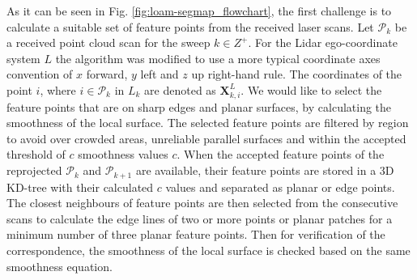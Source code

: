 \documentclass[letterpaper, 10 pt, conference]{ieeeconf}  %
\begin{document}
As it can be seen in Fig. \ref{fig:loam-segmap_flowchart}, the first challenge is to calculate a suitable set of feature points from the received laser scans. Let $\mathcal{P}_k$ be a received point cloud scan for the sweep $k \in Z^+$. For the Lidar ego-coordinate system ${L}$ the algorithm was modified to use a more typical coordinate axes convention of $x$ forward, $y$ left and $z$ up right-hand rule. The coordinates of the point $i$, where $i \in \mathcal{P}_k$ in ${L_k}$ are denoted as $\boldsymbol{X}_{k,i}^L$. 
We would like to select the feature points that are on sharp edges and planar surfaces, by calculating the smoothness of the local surface. The selected feature points are filtered by region to avoid over crowded areas, unreliable parallel surfaces and  within the accepted threshold of $c$ smoothness values $c$.
When the accepted feature points of the reprojected $\mathcal{P}_k$ and $\mathcal{P}_{k+1}$ are available, their feature points are stored in a 3D KD-tree with their calculated $c$ values and separated as planar or edge points. The closest neighbours of feature points are then selected from the consecutive scans to calculate the edge lines of two or more points or planar patches for a minimum number of three planar feature points. Then for verification of the correspondence, the smoothness of the local surface is checked based on the same smoothness equation.
\end{document}
